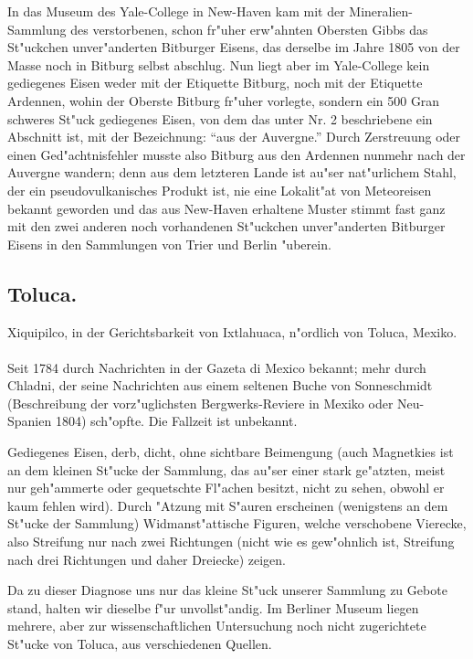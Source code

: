 \documentclass[a4paper, 11pt, oneside, polutonikogreek, german]{article}
\begin{document}
In das Museum des Yale-College in New-Haven kam mit der Mineralien-Sammlung des verstorbenen, schon fr"uher erw"ahnten Obersten Gibbs das St"uckchen unver"anderten Bitburger Eisens, das derselbe im Jahre 1805 von der Masse noch in Bitburg selbst abschlug. Nun liegt aber im Yale-College kein gediegenes Eisen weder mit der Etiquette Bitburg, noch mit der Etiquette Ardennen, wohin der Oberste Bitburg fr"uher vorlegte, sondern ein 500 Gran schweres St"uck gediegenes Eisen, von dem das unter Nr. 2 beschriebene ein Abschnitt ist, mit der Bezeichnung: "`aus der Auvergne."' Durch Zerstreuung oder einen Ged"achtnisfehler musste also Bitburg aus den Ardennen nunmehr nach der Auvergne wandern; denn aus dem letzteren Lande ist au"ser nat"urlichem Stahl, der ein pseudovulkanisches Produkt ist, nie eine Lokalit"at von Meteoreisen bekannt geworden und das aus New-Haven erhaltene Muster stimmt fast ganz mit den zwei anderen noch vorhandenen St"uckchen unver"anderten Bitburger Eisens in den Sammlungen von Trier und Berlin "uberein.
\subsection{Toluca.}
\begin{center}
\small
Xiquipilco, in der Gerichtsbarkeit von Ixtlahuaca, n"ordlich von Toluca, Mexiko.
\end{center}
\paragraph{}
Seit 1784 durch Nachrichten in der Gazeta di Mexico bekannt; mehr durch Chladni, der seine Nachrichten aus einem seltenen Buche von Sonneschmidt (Beschreibung der vorz"uglichsten Bergwerks-Reviere in Mexiko oder Neu-Spanien 1804) sch"opfte. Die Fallzeit ist unbekannt.

Gediegenes Eisen, derb, dicht, ohne sichtbare Beimengung (auch Magnetkies ist an dem kleinen St"ucke der Sammlung, das au"ser einer stark ge"atzten, meist nur geh"ammerte oder gequetschte Fl"achen besitzt, nicht zu sehen, obwohl er kaum fehlen wird). Durch "Atzung mit S"auren erscheinen (wenigstens an dem St"ucke der Sammlung) Widmanst"attische Figuren, welche verschobene Vierecke, also Streifung nur nach zwei Richtungen (nicht wie es gew"ohnlich ist, Streifung nach drei Richtungen und daher Dreiecke) zeigen.

Da zu dieser Diagnose uns nur das kleine St"uck unserer Sammlung zu Gebote stand, halten wir dieselbe f"ur unvollst"andig. Im Berliner Museum liegen mehrere, aber zur wissenschaftlichen Untersuchung noch nicht zugerichtete St"ucke von Toluca, aus verschiedenen Quellen.
\end{document}

